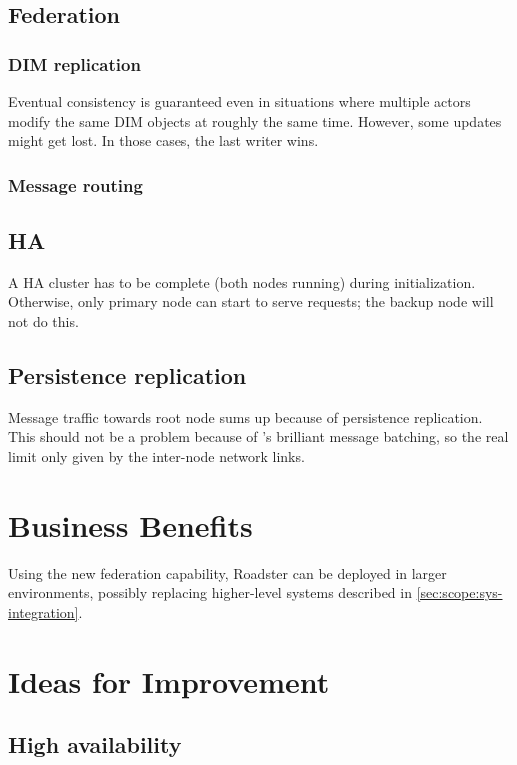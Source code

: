 \subsection{Federation}
\subsubsection{DIM replication}
Eventual consistency is guaranteed even in situations where multiple actors
modify the same DIM objects at roughly the same time. However, some updates
might get lost. In those cases, the last writer wins.

\subsubsection{Message routing}

\subsection{HA}
A HA cluster has to be complete (both nodes running) during initialization.
Otherwise, only primary node can start to serve requests; the backup node will not
do this.


\subsection{Persistence replication}
Message traffic towards root node sums up because of persistence
replication. This should not be a problem because of \zmq's brilliant
message batching, so the real limit only given by the inter-node network links.

\section{Business Benefits}
Using the new federation capability, Roadster can be deployed in larger
environments, possibly replacing higher-level systems described in
\autoref{sec:scope:sys-integration}.

\section{Ideas for Improvement}
\subsection{High availability}


